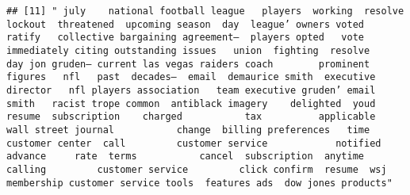 \documentclass[
]{article}
\begin{document}
\begin{verbatim}
## [11] " july    national football league   players  working  resolve  lockout  threatened  upcoming season  day  league’ owners voted  ratify   collective bargaining agreement—  players opted   vote   immediately citing outstanding issues   union  fighting  resolve    day jon gruden— current las vegas raiders coach        prominent figures   nfl   past  decades—  email  demaurice smith  executive director   nfl players association   team executive gruden’ email  smith   racist trope common  antiblack imagery    delighted  youd   resume  subscription    charged           tax          applicable   wall street journal           change  billing preferences   time   customer center  call         customer service            notified  advance     rate  terms           cancel  subscription  anytime  calling         customer service         click confirm  resume  wsj membership customer service tools  features ads  dow jones products"                                                                                                                                                                                                                                                                                                                                                                                                                                                                                                                                                                                                                                                                                                                                                                                                                                                                                                                                                                                                                                                                                                                                                                                                                                                                                                                                                                                                                                                                                                                                                                                                                                                                                                                                                                                                                                                                                                                                                                                                                                                                                                                                                                                                                                                                                                                                                                                                                                                                          
\end{verbatim}
\end{document}
